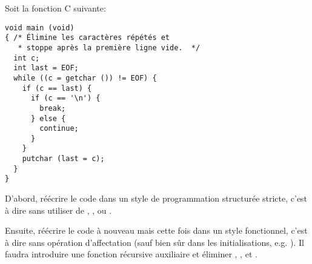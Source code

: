 \begin{Exercise}[title={Programmation fonctionnelle en C}]
Soit la fonction C suivante:
\begin{verbatim}
void main (void)
{ /* Élimine les caractères répétés et
   * stoppe après la première ligne vide.  */
  int c;
  int last = EOF;
  while ((c = getchar ()) != EOF) {
    if (c == last) {
      if (c == '\n') {
        break;
      } else {
        continue;
      }
    }
    putchar (last = c);
  }
}
\end{verbatim}
D'abord, réécrire le code dans un style de programmation structurée
stricte, c'est à dire sans utiliser de ,
, ou .

Ensuite, réécrire le code à nouveau mais cette fois dans un style
fonctionnel, c'est à dire sans opération d'affectation (sauf bien sûr dans
les initialisations, e.g. ).  Il faudra
introduire une fonction récursive auxiliaire et éliminer ,
, et .
\end{Exercise}